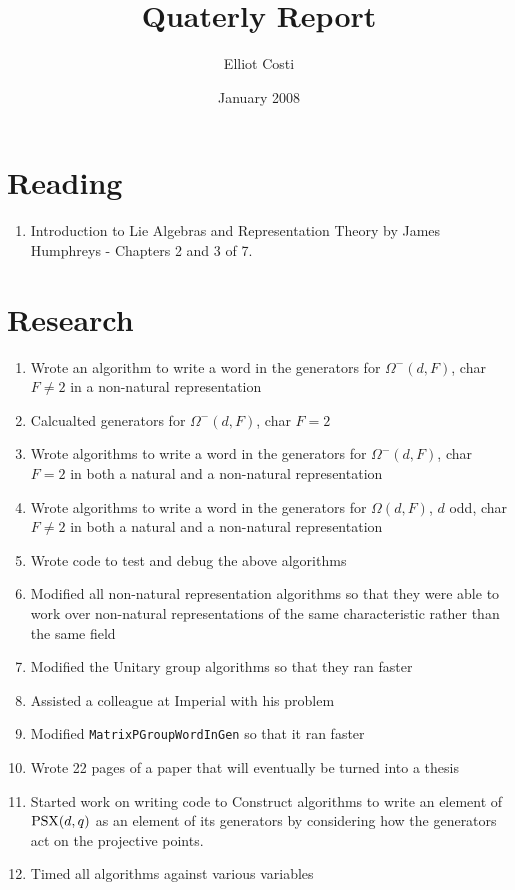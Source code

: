 \documentclass[12pt]{article}
\def\PSX{{\rm PSX}}
\begin{document}
\title{Quaterly Report}
\author{Elliot Costi}
\date{January 2008}
\maketitle

\newpage

\section{Reading}

\begin{enumerate}
\item Introduction to Lie Algebras and Representation Theory by James Humphreys - Chapters 2 and 3 of 7.
\end{enumerate}

\section{Research}

\begin{enumerate}
\item Wrote an algorithm to write a word in the generators for $\Omega^-(d, F)$, char $F \ne 2$ in a non-natural representation
\item Calcualted generators for $\Omega^-(d, F)$, char $F = 2$
\item Wrote algorithms to write a word in the generators for $\Omega^-(d, F)$, char $F = 2$ in both a natural and a non-natural representation
\item Wrote algorithms to write a word in the generators for $\Omega(d, F)$, $d$ odd, char $F \ne 2$ in both a natural and a non-natural representation
\item Wrote code to test and debug the above algorithms
\item Modified all non-natural representation algorithms so that they were able to work over non-natural representations of the same characteristic rather than the same field
\item Modified the Unitary group algorithms so that they ran faster
\item Assisted a colleague at Imperial with his problem
\item Modified {\tt MatrixPGroupWordInGen} so that it ran faster
\item Wrote 22 pages of a paper that will eventually be turned into a thesis
\item Started work on writing code to Construct algorithms to write an element of $\PSX(d, q)$ as an element of its generators by considering how the generators act on the projective points.
\item Timed all algorithms against various variables
\end{enumerate}
\end{document}
